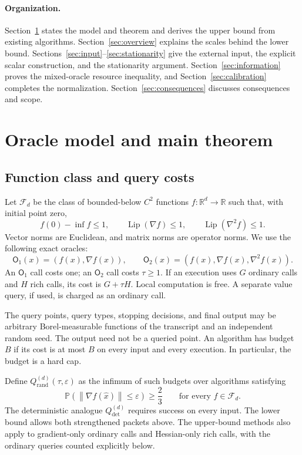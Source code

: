 \documentclass[11pt]{article}
\theoremstyle{definition}
\theoremstyle{remark}
\newcommand{\R}{\mathbb R}
\newcommand{\PP}{\mathbb P}
\newcommand{\eps}{\varepsilon}
\newcommand{\norm}[1]{\left\|#1\right\|}
\newcommand{\Lip}{\operatorname{Lip}}
\newcommand{\Qrand}{Q_{\mathrm{rand}}}
\newcommand{\Qdet}{Q_{\mathrm{det}}}
\begin{document}
\paragraph{Organization.}
Section~\ref{sec:model} states the model and theorem and derives the upper
bound from existing algorithms. Section~\ref{sec:overview} explains the
scales behind the lower bound. Sections~\ref{sec:input}--\ref{sec:stationarity}
give the external input, the explicit scalar construction, and the
stationarity argument. Section~\ref{sec:information} proves the mixed-oracle
resource inequality, and Section~\ref{sec:calibration} completes the
normalization. Section~\ref{sec:consequences} discusses consequences and scope.

\section{Oracle model and main theorem}\label{sec:model}
\subsection{Function class and query costs}
Let $\mathcal F_d$ be the class of bounded-below $C^2$ functions
$f:\R^d\to\R$ such that, with initial point zero,
\begin{equation}\label{eq:class}
 f(0)-\inf f\le1,\qquad
 \Lip(\nabla f)\le1,\qquad
 \Lip(\nabla^2 f)\le1.
\end{equation}
Vector norms are Euclidean, and matrix norms are operator norms.
We use the following exact oracles:
\[
 \mathsf O_1(x)=(f(x),\nabla f(x)),
 \qquad
 \mathsf O_2(x)=(f(x),\nabla f(x),\nabla^2f(x)).
\]
An $\mathsf O_1$ call costs one; an $\mathsf O_2$ call costs $\tau\ge1$.
If an execution uses $G$ ordinary calls and $H$ rich calls, its cost is
$G+\tau H$. Local computation is free. A separate value query, if used,
is charged as an ordinary call.

The query points, query types, stopping decisions, and final output may
be arbitrary Borel-measurable functions of the transcript and an
independent random seed. The output need not be a queried point.
An algorithm has budget $B$ if its cost is at most $B$ on every input
and every execution. In particular, the budget is a hard cap.

Define $\Qrand^{(d)}(\tau,\eps)$ as the infimum of such budgets over
algorithms satisfying
\[
 \PP\!\left(\norm{\nabla f(\widehat x)}\le\eps\right)\ge\frac23
 \qquad\text{for every }f\in\mathcal F_d.
\]
The deterministic analogue $\Qdet^{(d)}$ requires success on every input.
The lower bound allows both strengthened packets above.
The upper-bound methods also apply to gradient-only ordinary calls and
Hessian-only rich calls, with the ordinary queries counted explicitly below.
\end{document}
